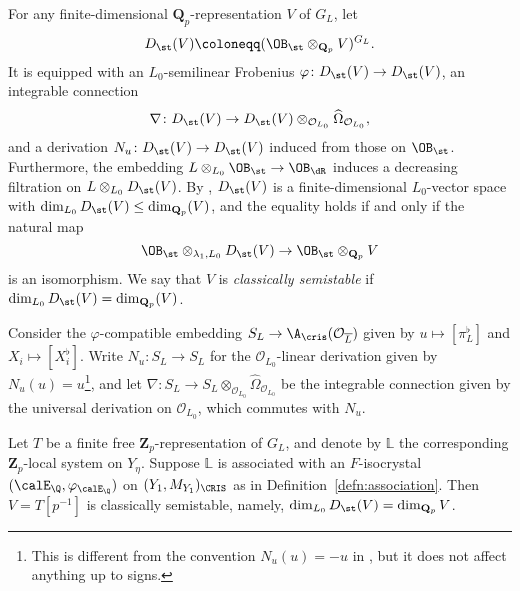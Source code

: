 For any finite-dimensional $\mathbf{Q}_p$-representation $V$ of $G_L$, let
\[
D_{\st}(V) \coloneqq (\OB_{\st}\otimes_{\mathbf{Q}_p} V)^{G_L}.
\]
It is equipped with an $L_0$-semilinear Frobenius $\varphi\colon D_{\st}(V) \rightarrow D_{\st}(V)$, an integrable connection
\[
\nabla\colon D_{\st}(V) \rightarrow D_{\st}(V)\otimes_{\mathcal{O}_{L_0}} \widehat{\Omega}_{\mathcal{O}_{L_0}}, 
\]
and a derivation $N_u\colon D_{\st}(V) \rightarrow D_{\st}(V)$ induced from those on $\OB_{\st}$. Furthermore, the embedding $L\otimes_{L_0} \OB_{\st} \rightarrow \OB_{\dR}$ induces a decreasing filtration on $L\otimes_{L_0} D_{\st}(V)$. By \cite{Morita-imperfsemistable}, $D_{\st}(V)$ is a finite-dimensional $L_0$-vector space with $\dim_{L_0} D_{\st}(V) \leq \dim_{\mathbf{Q}_p}(V)$, and the equality holds if and only if the natural map
\[
\OB_{\st}\otimes_{\lambda_1, L_0} D_{\st}(V)  \rightarrow \OB_{\st}\otimes_{\mathbf{Q}_p} V
\]
is an isomorphism. We say that $V$ is \textit{classically semistable} if $\dim_{L_0} D_{\st}(V) = \dim_{\mathbf{Q}_p}(V)$.

Consider the $\varphi$-compatible embedding $S_L \rightarrow \A_{\cris}(\mathcal{O}_{\overline{L}})$ given by $u \mapsto [\pi_L^{\flat}]$ and $X_i \mapsto [X_i^{\flat}]$. Write $N_u\colon S_L \rightarrow S_L$ for the $\mathcal{O}_{L_0}$-linear derivation given by $N_u(u) = u$\footnote{This is different from the convention $N_u (u) = -u$ in \cite{breuil-representations}, but it does not affect anything up to signs.}, and let $\nabla\colon S_L \rightarrow S_L\otimes_{\mathcal{O}_{L_0}} \widehat{\Omega}_{\mathcal{O}_{L_0}}$ be the integrable connection given by the universal derivation on $\mathcal{O}_{L_0}$, which commutes with $N_u$. 

\begin{prop} \label{prop:CDVR-semistable-implies-Bst-admissible}
Let $T$ be a finite free $\mathbf{Z}_p$-representation of $G_L$, and denote by $\mathbb{L}$ the corresponding $\mathbf{Z}_p$-local system on $Y_{\eta}$. Suppose $\mathbb{L}$ is associated with an $F$-isocrystal $(\calE_\Q,\varphi_{\calE_\Q})$ on $(Y_1,M_{Y_1})_{\CRIS}$ as in Definition~\ref{defn:association}. Then $V = T[p^{-1}]$ is classically semistable, namely, $\dim_{L_0} D_{\st}(V) = \dim_{\mathbf{Q}_p} V$.
\end{prop}

